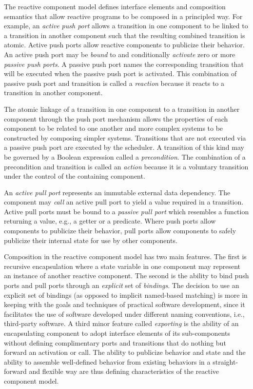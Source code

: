 
The reactive component model defines interface elements and composition semantics that allow reactive programs to be composed in a principled way.
For example, an \emph{active push port} allows a transition in one component to be linked to a transition in another component such that the resulting combined transition is atomic.
Active push ports allow reactive components to publicize their behavior.
An active push port may be \emph{bound} to and conditionally \emph{activate} zero or more \emph{passive push ports}.
A passive push port names the corresponding transition that will be executed when the passive push port is activated.
This combination of passive push port and transition is called a \emph{reaction} because it reacts to a transition in another component.

The atomic linkage of a transition in one component to a transition in another component through the push port mechanism allows the properties of each component to be related to one another and more complex systems to be constructed by composing simpler systems.
Transitions that are not executed via a passive push port are executed by the scheduler.
A transition of this kind may be governed by a Boolean expression called a \emph{precondition}.
The combination of a precondition and transition is called an \emph{action} because it is a voluntary transition under the control of the containing component.

An \emph{active pull port} represents an immutable external data dependency.
The component may \emph{call} an active pull port to yield a value required in a transition.
Active pull ports must be bound to a \emph{passive pull port} which resembles a function returning a value, e.g., a getter or a predicate.
Where push ports allow components to publicize their behavior, pull ports allow components to safely publicize their internal state for use by other components.

Composition in the reactive component model has two main features.
The first is recursive encapsulation where a state variable in one component may represent an instance of another reactive component.
The second is the ability to bind push ports and pull ports through an \emph{explicit} set of \emph{bindings}.
The decision to use an explicit set of bindings (as opposed to implicit named-based matching) is more in keeping with the goals and techniques of practical software development, since it facilitates the use of software developed under different naming conventions, i.e., third-party software.
A third minor feature called \emph{exporting} is the ability of an encapsulating component to adopt interface elements of its sub-components without defining complimentary ports and transitions that do nothing but forward an activation or call.
The ability to publicize behavior and state and the ability to assemble well-defined behavior from existing behaviors in a straight-forward and flexible way are thus defining characteristics of the reactive component model.

